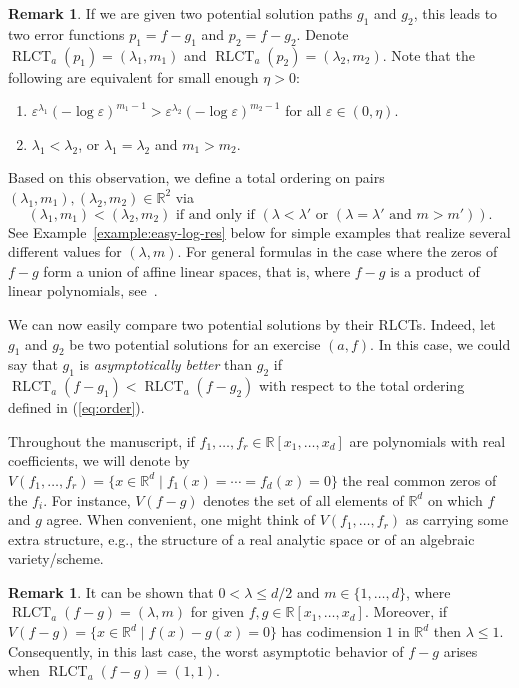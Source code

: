 \documentclass[11pt]{amsart}
\DeclareMathOperator{\rlct}{RLCT}
\numberwithin{equation}{section}
\theoremstyle{plain}
\theoremstyle{definition}
\newtheorem{remark}[theorem]{Remark}
\newcommand{\R}{\mathbb{R}}
\begin{document}
\begin{remark}\label{remark:asymptotics}
    If we are given two potential solution paths $g_1$ and $g_2$, this leads to two error functions $p_1 = f-g_1$ and $p_2 = f- g_2$. Denote $\rlct_a(p_1) = (\lambda_1,m_1)$ and $\rlct_a(p_2) = (\lambda_2,m_2)$. Note that the following are equivalent for small enough $\eta > 0$:
\begin{enumerate}
    \item $\varepsilon^{\lambda_1} (- \log \varepsilon)^{m_1-1} > \varepsilon^{\lambda_2} (- \log \varepsilon)^{m_2-1}$ for all $\varepsilon \in (0,\eta)$.
    \item $\lambda_1 < \lambda_2$, or $\lambda_1 = \lambda_2$ and $m_1 > m_2$.
\end{enumerate}
Based on this observation, we define a total ordering on pairs
 $(\lambda_1,m_1),(\lambda_2,m_2) \in \R^2$ via
 \begin{equation}\label{eq:order}
 (\lambda_1,m_1) < (\lambda_2,m_2) \text{ if and only if } (\lambda < \lambda' \text{ or } (\lambda = \lambda' \text{ and } m > m')).
 \end{equation}
 See Example~\ref{example:easy-log-res} below for simple examples that realize several different values for $(\lambda,m)$. For general formulas in the case where the zeros of $f-g$ form a union of affine linear spaces, that is, where $f-g$ is a product of linear polynomials, see~\cite{KostaWindisch}.

  We can now easily compare two potential solutions by their RLCTs.
     Indeed, let $g_1$ and $g_2$ be two potential solutions for an exercise $(a,f)$. In this case, we could say that $g_1$ is \emph{asymptotically better} than $g_2$ if $\rlct_a(f-g_1) < \rlct_a(f-g_2)$ with respect to the total ordering defined in (\ref{eq:order}).
\end{remark}




Throughout the manuscript, if $f_1,\ldots,f_r \in \R[x_1,\ldots,x_d]$ are polynomials with real coefficients, we will denote by $V(f_1,\ldots,f_r) = \{x \in \R^d \mid f_1(x) = \cdots = f_d(x) = 0\}$ the real common zeros of the $f_i$. For instance, $V(f-g)$ denotes the set of all elements of $\R^d$ on which $f$ and $g$ agree. When convenient, one might think of $V(f_1,\ldots,f_r)$ as carrying some extra structure, e.g., the structure of a real analytic space or of an algebraic variety/scheme.
 \begin{remark}\label{remark:worst-case}
     It can be shown that $0 <  \lambda \leq d/2$ and $m \in \{1,\ldots,d\}$, where $\rlct_a(f-g) = (\lambda, m)$ for given $f,g \in \R[x_1,\ldots,x_d]$. Moreover, if $V(f-g) = \{x \in \R^d \mid f(x) - g(x) = 0\}$ has codimension $1$ in $\R^d$ then $\lambda \leq 1$. Consequently, in this last case, the worst asymptotic behavior of $f-g$ arises when $\rlct_a(f-g) = (1,1)$.
 \end{remark}
\end{document}
